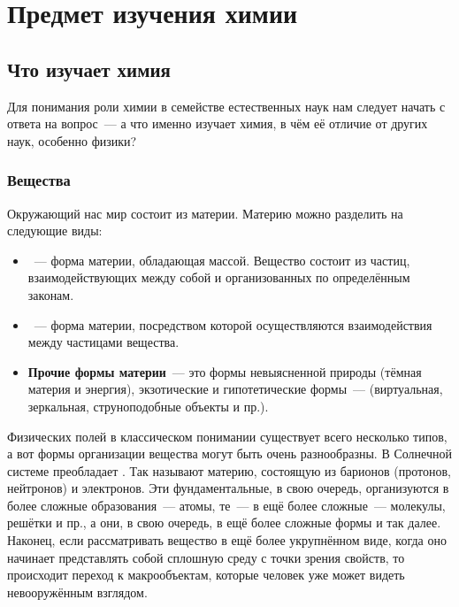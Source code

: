 \chapter{Предмет изучения химии}

\section{Что изучает химия}

Для понимания роли химии в семействе естественных наук нам следует начать с ответа на вопрос~--- а что именно изучает химия, в чём её отличие от других наук, особенно физики?

\subsection*{Вещества}

Окружающий нас мир состоит из материи. Материю можно разделить на следующие виды:

\begin{itemize}
    \item {}~--- форма материи, обладающая массой. Вещество состоит из частиц, взаимодействующих между собой и организованных по определённым законам.
    \item {}~--- форма материи, посредством которой осуществляются взаимодействия между частицами вещества.
    \item \textbf{Прочие формы материи}~--- это формы невыясненной природы (тёмная материя и энергия), экзотические и гипотетические формы~--- (виртуальная, зеркальная, струноподобные объекты и пр.).
\end{itemize}

Физических полей в классическом понимании существует всего несколько типов, а вот формы организации вещества могут быть очень разнообразны. В Солнечной системе преобладает . Так называют материю, состоящую из барионов (протонов, нейтронов) и электронов. Эти фун\-да\-мен\-таль\-ные, в свою очередь, организуются в более сложные образования~--- атомы, те~--- в ещё более сложные~--- молекулы, решётки и пр., а они, в свою очередь, в ещё более сложные формы и так далее. Наконец, если рассматривать вещество в ещё более укрупнённом виде, когда оно начинает представлять собой сплошную среду с точки зрения свойств, то происходит переход к макрообъектам, которые человек уже может видеть невооружённым взглядом.

